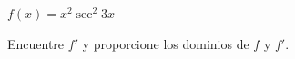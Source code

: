 \setcounter{enumi}{62}
\item $f(x) = x^2 \sec^2 3x$
\par
Encuentre $f'$ y proporcione los dominios de $f$ y $f'$.
